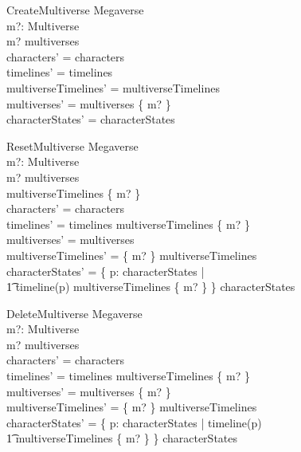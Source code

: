 \documentclass{article}
\begin{document}
\begin{schema}{CreateMultiverse}
\Delta Megaverse \\
m?: Multiverse \\
\where
m? \notin multiverses \\
characters' = characters \\
timelines' = timelines \\
multiverseTimelines' = multiverseTimelines \\
multiverses' = multiverses \cup \{ m? \} \\ 
characterStates' = characterStates \\
\end{schema}

\begin{schema}{ResetMultiverse}
\Delta Megaverse \\
m?: Multiverse \\
\where
m? \in multiverses \\
multiverseTimelines \limg \{ m? \} \rimg \neq \emptyset \\
characters' = characters \\
timelines' = timelines \setminus multiverseTimelines \limg \{ m? \} \rimg   \\
multiverses' = multiverses \\
multiverseTimelines' = \{ m? \} \ndres multiverseTimelines \\
characterStates' = \{ p: \dom characterStates | \\
\t1 timeline(p) \in multiverseTimelines \limg \{ m? \} \rimg 
  \} \ndres characterStates \\
\end{schema} 

\begin{schema}{DeleteMultiverse}
\Delta Megaverse \\
m?: Multiverse \\
\where
m? \in multiverses \\
characters' = characters \\
timelines' = timelines \setminus multiverseTimelines \limg \{ m? \} \rimg   \\
multiverses' = multiverses \setminus \{ m? \} \\
multiverseTimelines' = \{ m? \} \ndres multiverseTimelines \\
characterStates' = \{ p: \dom characterStates | timeline(p) \\
\t1 \in multiverseTimelines \limg \{ m? \} \rimg \} \ndres characterStates \\
\end{schema} 
\end{document}
